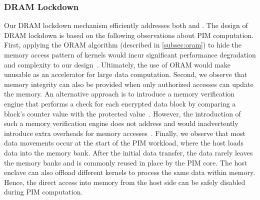 \subsubsection{DRAM Lockdown}


\label{subsec:access-control}
\label{subsec:selective}
Our DRAM lockdown mechanism efficiently addresses both  and . The design of DRAM lockdown is based on the following observations about PIM computation. First, applying the ORAM algorithm (described in \cref{subsec:oram}) to hide the memory access pattern of \thename kernels would incur significant performance degradation and complexity to our design~\cite{zerotrace,freecursive-oram}. Ultimately, the use of ORAM would make \thename unusable as an accelerator for large data computation. Second, we observe that memory integrity can also be provided when only authorized accesses can update the memory. An alternative approach is to introduce a memory verification engine that performs a check for each encrypted data block by comparing a block's counter value with the protected value~\cite{bonsaimerkletree,common-counter}. However, the introduction of such a memory verification engine does not address  and would inadvertently introduce extra overheads for memory accesses~\cite{bonsaimerkletree,common-counter}.
Finally, we observe that most data movements occur at the start of the PIM workload, where the host loads data into the memory bank. After the initial data transfer, the data rarely leaves the memory banks and is commonly reused in place by the PIM core. The host enclave can also offload different kernels to process the same data within memory. Hence, the direct access into memory from the host side can be safely disabled during PIM computation. 


